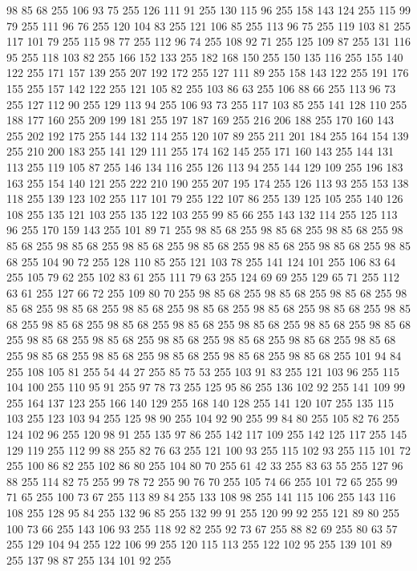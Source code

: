 98 85 68 255 106 93 75 255 126 111 91 255 130 115 96 255 158 143 124 255 115 99 79 255 111 96 76 255 120 104 83 255 121 106 85 255 113 96 75 255 119 103 81 255 117 101 79 255 115 98 77 255 112 96 74 255 108 92 71 255 125 109 87 255 131 116 95 255 118 103 82 255 166 152 133 255 182 168 150 255 150 135 116 255 155 140 122 255 171 157 139 255 207 192 172 255 127 111 89 255 158 143 122 255 191 176 155 255 157 142 122 255 121 105 82 255 103 86 63 255 106 88 66 255 113 96 73 255 127 112 90 255 129 113 94 255 106 93 73 255 117 103 85 255 141 128 110 255 188 177 160 255 209 199 181 255 197 187 169 255 216 206 188 255 170 160 143 255 202 192 175 255 144 132 114 255 120 107 89 255 211 201 184 255 164 154 139 255 210 200 183 255 141 129 111 255 174 162 145 255 171 160 143 255 144 131 113 255 119 105 87 255 146 134 116 255 126 113 94 255 144 129 109 255 196 183 163 255 154 140 121 255 222 210 190 255 207 195 174 255 126 113 93 255 153 138 118 255 139 123 102 255 117 101 79 255
122 107 86 255 139 125 105 255 140 126 108 255 135 121 103 255 135 122 103 255 99 85 66 255 143 132 114 255 125 113 96 255 170 159 143 255 101 89 71 255 98 85 68 255 98 85 68 255 98 85 68 255 98 85 68 255 98 85 68 255 98 85 68 255 98 85 68 255 98 85 68 255 98 85 68 255 98 85 68 255 104 90 72 255 128 110 85 255 121 103 78 255 141 124 101 255 106 83 64 255 105 79 62 255 102 83 61 255 111 79 63 255 124 69 69 255 129 65 71 255 112 63 61 255 127 66 72 255 109 80 70 255 98 85 68 255 98 85 68 255 98 85 68 255 98 85 68 255 98 85 68 255 98 85 68 255 98 85 68 255 98 85 68 255 98 85 68 255 98 85 68 255 98 85 68 255 98 85 68 255 98 85 68 255 98 85 68 255 98 85 68 255 98 85 68 255 98 85 68 255 98 85 68 255 98 85 68 255 98 85 68 255 98 85 68 255 98 85 68 255 98 85 68 255 98 85 68 255 98 85 68 255 98 85 68 255 98 85 68 255 101 94 84 255 108 105 81 255 54 44 27 255 85 75 53 255
103 91 83 255 121 103 96 255 115 104 100 255 110 95 91 255 97 78 73 255 125 95 86 255 136 102 92 255 141 109 99 255 164 137 123 255 166 140 129 255 168 140 128 255 141 120 107 255 135 115 103 255 123 103 94 255 125 98 90 255 104 92 90 255 99 84 80 255 105 82 76 255 124 102 96 255 120 98 91 255 135 97 86 255 142 117 109 255 142 125 117 255 145 129 119 255 112 99 88 255 82 76 63 255 121 100 93 255 115 102 93 255 115 101 72 255 100 86 82 255 102 86 80 255 104 80 70 255 61 42 33 255 83 63 55 255 127 96 88 255 114 82 75 255 99 78 72 255 90 76 70 255 105 74 66 255 101 72 65 255 99 71 65 255 100 73 67 255 113 89 84 255 133 108 98 255 141 115 106 255 143 116 108 255 128 95 84 255 132 96 85 255 132 99 91 255 120 99 92 255 121 89 80 255 100 73 66 255 143 106 93 255 118 92 82 255 92 73 67 255 88 82 69 255 80 63 57 255 129 104 94 255 122 106 99 255 120 115 113 255 122 102 95 255 139 101 89 255 137 98 87 255 134 101 92 255
